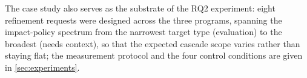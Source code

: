 The case study also serves as the substrate of the RQ2 experiment: eight refinement requests were designed across the three programs, spanning the impact-policy spectrum from the narrowest target type (evaluation) to the broadest (needs context), so that the expected cascade scope varies rather than staying flat; the measurement protocol and the four control conditions are given in \cref{sec:experiments}.
